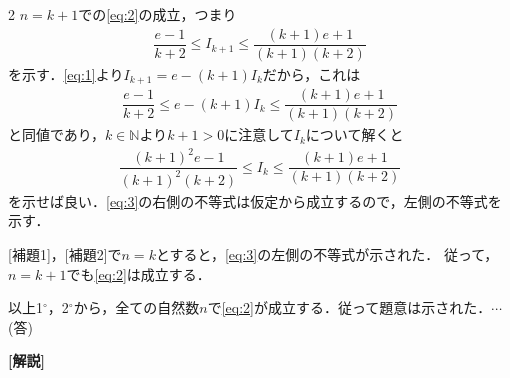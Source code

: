 \documentclass[../../main.tex]{subfiles}
\begin{document}
\begin{multicols}{2}
  $n=k+1$での\cref{eq:2}の成立，つまり
  \begin{align}
    \dfrac{e-1}{k+2} \le I_{k+1} \le \dfrac{(k+1)e+1}{(k+1)(k+2)}
  \end{align}
  を示す．\cref{eq:1}より$I_{k+1}=e-(k+1)I_k$だから，これは
  \begin{align}
    \dfrac{e-1}{k+2} \le e-(k+1)I_k \le \dfrac{(k+1)e+1}{(k+1)(k+2)}
  \end{align}
  と同値であり，$k \in \mathbb{N}$より$k+1>0$に注意して$I_k$について解くと
  \begin{align}
    \dfrac{(k+1)^2e-1}{(k+1)^2(k+2)} \le I_k \le \dfrac{(k+1)e+1}{(k+1)(k+2)} \label{eq:3}
  \end{align}
  を示せば良い．\cref{eq:3}の右側の不等式は仮定から成立するので，左側の不等式を示す．

  [補題1]，[補題2]で$n=k$とすると，\cref{eq:3}の左側の不等式が示された．
  従って，$n=k+1$でも\cref{eq:2}は成立する．

  以上1$^\circ$，2$^\circ$から，全ての自然数$n$で\cref{eq:2}が成立する．従って題意は示された．$\cdots$(答)

  {\bf [解説]}

  \newpage
\end{multicols}
\end{document}
